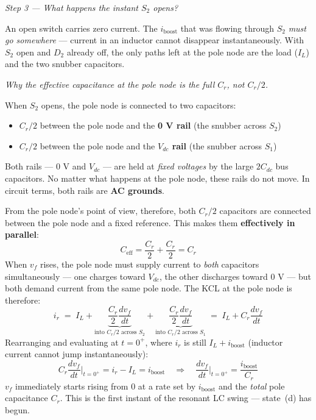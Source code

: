 \documentclass[12pt, a4paper]{article}
\def\,{ }%
\newcommand{\Vdc}{V_{dc}}
\newcommand{\vf}{v_f}
\newcommand{\ir}{i_r}
\newcommand{\IL}{I_L}
\newcommand{\Cr}{C_r}
\begin{document}
\medskip
\textit{Step 3 — What happens the instant $S_2$ opens?}

An open switch carries zero current.
The $i_\text{boost}$ that was flowing through $S_2$ \emph{must go somewhere}
--- current in an inductor cannot disappear instantaneously.
With $S_2$ open and $D_2$ already off, the only paths left at the pole node
are the load ($\IL$) and the two snubber capacitors.

\medskip
\textit{Why the effective capacitance at the pole node is the full $\Cr$,
not $\Cr/2$.}

When $S_2$ opens, the pole node is connected to two capacitors:
\begin{itemize}
    \item $\Cr/2$ between the pole node and the \textbf{0\,V rail}
          (the snubber across $S_2$)
    \item $\Cr/2$ between the pole node and the \textbf{$\Vdc$ rail}
          (the snubber across $S_1$)
\end{itemize}
Both rails --- 0\,V and $\Vdc$ --- are held at \emph{fixed voltages} by
the large $2C_{dc}$ bus capacitors.
No matter what happens at the pole node, these rails do not move.
In circuit terms, both rails are \textbf{AC grounds}.

From the pole node's point of view, therefore, both $\Cr/2$ capacitors
are connected between the pole node and a fixed reference.
This makes them \textbf{effectively in parallel}:
\begin{equation*}
    C_\text{eff} = \frac{\Cr}{2} + \frac{\Cr}{2} = \Cr
\end{equation*}
When $\vf$ rises, the pole node must supply current to \emph{both}
capacitors simultaneously --- one charges toward $\Vdc$, the other
discharges toward 0\,V --- but both demand current from the same pole node.
The KCL at the pole node is therefore:
\begin{equation}
    \ir \;=\; \IL
        + \underbrace{\frac{\Cr}{2}\frac{d\vf}{dt}}_{\text{into }
              \Cr/2\text{ across }S_2}
        + \underbrace{\frac{\Cr}{2}\frac{d\vf}{dt}}_{\text{into }
              \Cr/2\text{ across }S_1}
    \;=\; \IL + \Cr\frac{d\vf}{dt}
    \label{eq:kcl_pole}
\end{equation}
Rearranging and evaluating at $t = 0^+$, where $\ir$ is still
$\IL + i_\text{boost}$ (inductor current cannot jump instantaneously):
\begin{equation}
    \Cr\,\frac{d\vf}{dt}\bigg|_{t=0^+}
        = \ir - \IL = i_\text{boost}
    \quad\Longrightarrow\quad
    \frac{d\vf}{dt}\bigg|_{t=0^+} = \frac{i_\text{boost}}{\Cr}
    \label{eq:vf_initial_slope}
\end{equation}
$\vf$ immediately starts rising from 0 at a rate set by $i_\text{boost}$
and the \emph{total} pole capacitance $\Cr$.
This is the first instant of the resonant LC swing --- state~(d) has begun.
\end{document}
